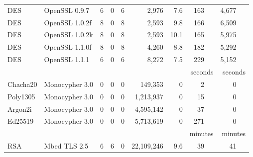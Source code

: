 \begin{table}[h]
\begin{tabular}{llrrrrrrr}
        DES                & OpenSSL 0.9.7            & 6                      & 0                   & 6                    & 2,976       & 7.6  & 163 ~~    & 4,677       ~~  \\
        DES                & OpenSSL 1.0.2f           & 8                      & 0                   & 8                    & 2,593       & 9.8  & 166 ~~    & 6,509       ~~  \\
        DES                & OpenSSL 1.0.2k           & 8                      & 0                   & 8                    & 2,593       & 10.1 & 165 ~~    & 5,975        ~~ \\
        DES                & OpenSSL 1.1.0f           & 8                      & 0                   & 8                    & 4,260       & 8.8  & 182 ~~    & 5,292        ~~ \\
        DES                & OpenSSL 1.1.1            & 6                      & 0                   & 6                    & 8,272       & 7.5  & 229 ~~    & 5,152       ~~  \\
                           &                          &                        &                     &                      &             &      & seconds   & seconds               \\\cline{8-9}
        Chacha20           & Monocypher 3.0           & 0                      & 0                   & 0                    & 149,353     & 0    & 2 ~~    & 0           ~~  \\  
        Poly1305           & Monocypher 3.0           & 0                      & 0                   & 0                    & 1,213,937   & 0    & 15 ~~   & 0           ~~  \\
        Argon2i            & Monocypher 3.0           & 0                      & 0                   & 0                    & 4,595,142   & 0    & 37 ~~   & 0           ~~  \\
        Ed25519              & Monocypher 3.0           & 0                      & 0                   & 0                    & 5,713,619   & 0    & 271 ~~  & 0           ~~  \\
                           &                          &                        &                     &                      &             &      & minutes   & minutes         \\\cline{8-9}
        RSA                & Mbed TLS 2.5             & 6                      & 6                   & 0                    & 22,109,246  & 9.6  & 39 ~~     & 41  ~~          \\

\end{tabular}
\end{table}
